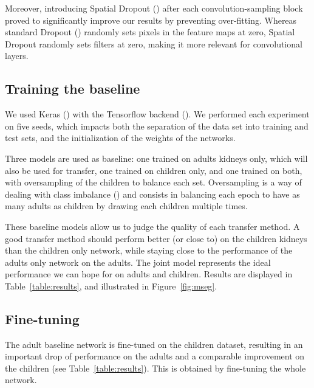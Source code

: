 Moreover, introducing Spatial Dropout (\textcite{tompson2015CVPR}) after each convolution-sampling block proved to significantly improve our results by preventing over-fitting. Whereas standard Dropout (\textcite{srivastava2014}) randomly sets pixels in the feature maps at zero, Spatial Dropout randomly sets filters at zero, making it more relevant for convolutional layers.

\subsection{Training the baseline}
\label{ssec:training_baseline}

We used Keras (\textcite{chollet2015keras}) with the Tensorflow backend (\textcite{tensorflow2015}). We performed each experiment on five seeds, which impacts both the separation of the data set into training and test sets, and the initialization of the weights of the networks.

Three models are used as baseline: one trained on adults kidneys only, which will also be used for transfer, one trained on children only, and one trained on both, with oversampling of the children to balance each set. Oversampling is a way of dealing with class imbalance (\textcite{buda2017}) and consists in balancing each epoch to have as many adults as children by drawing each children multiple times.

These baseline models allow us to judge the quality of each transfer method. A good transfer method should perform better (or close to) on the children kidneys than the children only network, while staying close to the performance of the adults only network on the adults. The joint model represents the ideal performance we can hope for on adults and children. Results are displayed in Table~\ref{table:results}, and illustrated in Figure~\ref{fig:mseg}.

\subsection{Fine-tuning}
\label{ssec:baseline_finetune}

The adult baseline network is fine-tuned on the children dataset, resulting in an important drop of performance on the adults and a comparable improvement on the children (see Table~\ref{table:results}). This is obtained by fine-tuning the whole network. 

